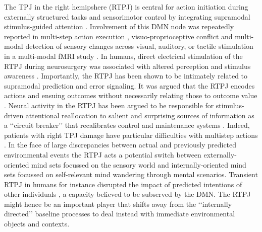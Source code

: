 \documentclass[10pt,letterpaper]{article}
\begin{document}
The TPJ in the right hemipshere (RTPJ) is central for
action initiation during externally structured tasks and
sensorimotor control by integrating supramodal stimulus-guided attention
\citep{corbetta2002control}.
Involvement of this DMN node was repeatedly reported in
multi-step action execution \citep{hartmann2005takes},
visuo-proprioceptive conflict \citep{Balslev2005} and
multi-modal detection of sensory changes across
visual, auditory, or tactile stimulation in a multi-modal fMRI study
\citep{downar2000multimodal}.
In humans, direct electrical stimulation of the
RTPJ during neurosurgery was associated with altered perception
and stimulus awareness \citep{blanke2002neuropsychology}.
%
Importantly, the RTPJ has been shown to be intimately related to
supramodal prediction and error signaling.
It was argued that the RTPJ encodes actions and ensuing outcomes
without necessarily relating those to outcome value
\citep{liljeholm2013neural, hamilton2008action,
jakobs2009effects}.
Neural activity in the RTPJ has been argued to be responsible
for stimulus-driven attentional reallocation to
salient and surprising sources of information
as a ‘‘circuit breaker’’ that recalibrates control and maintenance systems
\citep{bzdok2013tpj, corbettashul2008}.
Indeed, patients with right TPJ damage have particular difficulties
with multistep actions \citep{hartmann2005takes}.
In the face of large discrepancies between actual and previously predicted
environmental events the RTPJ acts a potential switch between
externally-oriented mind sets focussed on the
sensory world and internally-oriented mind sets focussed
on self-relevant mind wandering through mental scenarios.
Transient RTPJ in humans for instance disrupted the
impact of predicted intentions of other individuals
\citep{young2010disruption},
a capacity believed to be subserved by the DMN.
The RTPJ might hence be an important player that shifts away
from the ‘‘internally directed’’ baseline processes
to deal instead with immediate environmental objects and contexts.
\end{document}
